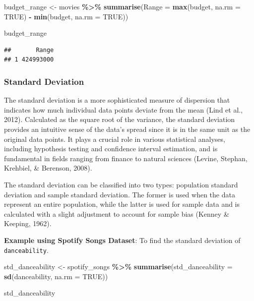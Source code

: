 \documentclass[
  b5paper]{book}
\newenvironment{Shaded}{\begin{snugshade}}{\end{snugshade}}
\newcommand{\AttributeTok}[1]{\textcolor[rgb]{0.13,0.29,0.53}{#1}}
\newcommand{\ConstantTok}[1]{\textcolor[rgb]{0.56,0.35,0.01}{#1}}
\newcommand{\FunctionTok}[1]{\textcolor[rgb]{0.13,0.29,0.53}{\textbf{#1}}}
\newcommand{\NormalTok}[1]{#1}
\newcommand{\OtherTok}[1]{\textcolor[rgb]{0.56,0.35,0.01}{#1}}
\newcommand{\SpecialCharTok}[1]{\textcolor[rgb]{0.81,0.36,0.00}{\textbf{#1}}}
\begin{document}
\begin{Shaded}
\begin{Highlighting}[]
\NormalTok{budget\_range }\OtherTok{\textless{}{-}}\NormalTok{ movies }\SpecialCharTok{\%\textgreater{}\%} 
  \FunctionTok{summarise}\NormalTok{(}\AttributeTok{Range =} \FunctionTok{max}\NormalTok{(budget, }\AttributeTok{na.rm =} \ConstantTok{TRUE}\NormalTok{) }\SpecialCharTok{{-}} \FunctionTok{min}\NormalTok{(budget, }\AttributeTok{na.rm =} \ConstantTok{TRUE}\NormalTok{))}

\NormalTok{budget\_range}
\end{Highlighting}
\end{Shaded}

\begin{verbatim}
##       Range
## 1 424993000
\end{verbatim}

\hypertarget{standard-deviation}{%
\subsubsection*{Standard Deviation}\label{standard-deviation}}

The standard deviation is a more sophisticated measure of dispersion that indicates how much individual data points deviate from the mean (Lind et al., 2012). Calculated as the square root of the variance, the standard deviation provides an intuitive sense of the data's spread since it is in the same unit as the original data points. It plays a crucial role in various statistical analyses, including hypothesis testing and confidence interval estimation, and is fundamental in fields ranging from finance to natural sciences (Levine, Stephan, Krehbiel, \& Berenson, 2008).

The standard deviation can be classified into two types: population standard deviation and sample standard deviation. The former is used when the data represent an entire population, while the latter is used for sample data and is calculated with a slight adjustment to account for sample bias (Kenney \& Keeping, 1962).

\textbf{Example using Spotify Songs Dataset}: To find the standard deviation of \texttt{danceability}.

\begin{Shaded}
\begin{Highlighting}[]
\NormalTok{std\_danceability }\OtherTok{\textless{}{-}}\NormalTok{ spotify\_songs }\SpecialCharTok{\%\textgreater{}\%} 
  \FunctionTok{summarise}\NormalTok{(}\AttributeTok{std\_danceability =} \FunctionTok{sd}\NormalTok{(danceability, }\AttributeTok{na.rm =} \ConstantTok{TRUE}\NormalTok{))}

\NormalTok{std\_danceability}
\end{Highlighting}
\end{Shaded}
\end{document}
